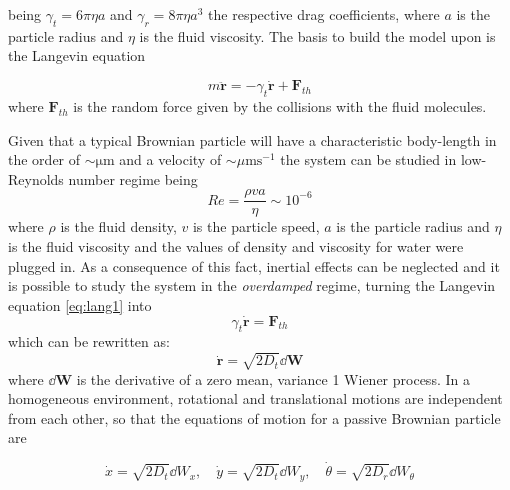 \documentclass[../../master_thesis_np.tex]{subfiles}
\begin{document}
	being $\gamma_t = 6 \pi \eta a$ and $\gamma_r = 8 \pi \eta a^3$  the respective drag coefficients, where $a$ is the particle radius and $\eta$ is the fluid viscosity. 
	The basis to build the model upon is the Langevin equation
	
	\begin{equation} \label{eq:lang1}
		m \mathbf{\ddot{r}} = -\gamma_t \mathbf{\dot{r}} + \mathbf{F}_{th}
	\end{equation} 
	where $\mathbf{F}_{th}$ is the random force given by the collisions with the fluid molecules.
	
	Given that a typical Brownian particle will have a characteristic body-length in the order of $ \mathrm{\sim\mu m}$ and a velocity of $\sim\mu \mathrm{m s}^{-1}$ the system can be studied in low-Reynolds number regime being 
	\begin{equation}
	Re = \frac{\rho v a}{\eta} \sim 10^{-6} 
	\end{equation}  
	where $\rho$ is the fluid density, $v$ is the particle speed, $a$ is the particle radius and $\eta$ is the fluid viscosity and the values of density and viscosity for water were plugged in. 
	As a consequence of this fact, inertial effects can be neglected and it is possible to study the system in the \emph{overdamped} regime, turning the Langevin equation \ref{eq:lang1} into
	\begin{equation} \label{eq:lang2}
		\gamma_t \mathbf{\dot{r}} = \mathbf{F}_{th}
	\end{equation}
	which can be rewritten as:
	\begin{equation}
		\mathbf{\dot{r}} = \sqrt{2D_t} \dd{\mathbf{W}}
	\end{equation}
	where $\dd{\mathbf{W}}$ is the derivative of a zero mean, variance 1 Wiener process.
	In a homogeneous environment, rotational and translational motions are independent from each other, so that the equations of motion for a passive Brownian particle are
	
	\begin{equation}
		\dot{x} = \sqrt{2D_t}\dd{W_x}, \quad \dot{y} = \sqrt{2D_t}\dd{W_y}, \quad \dot{\theta} = \sqrt{2D_r}\dd{W_{\theta}}
	\end{equation}
	
	
\end{document}
